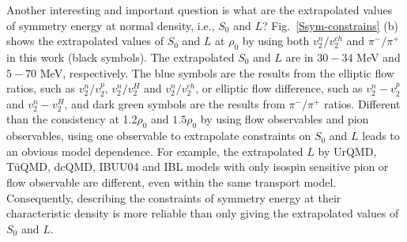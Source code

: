 \documentclass[reprint,aps,prc,twocolumn,superscriptaddress]{revtex4-1}
\begin{document}
Another interesting and important question is what are the extrapolated values of symmetry energy at normal density, i.e., $S_0$ and $L$? Fig.~\ref{Ssym-constrains} (b) shows the extrapolated values of $S_0$ and $L$ at $\rho_0$ by using both $v_2^n/v_2^{ch}$ and $\pi^-/\pi^+$ in this work (black symbols). The extrapolated $S_0$ and $L$ are in $30-34$ MeV and $5-70$ MeV, respectively. The blue symbols are the results from the elliptic flow ratios, such as $v_2^n/v_2^p$, $v_2^n/v_2^H$ and $v_2^n/v_2^{ch}$\cite{Russotto2011PLB,Cozma2013PRC,WangYJ2014PRC,Russotto2016PRC,Cozma2018EPJ}, or elliptic flow difference, such as $v_2^n-v_2^p$ and $v_2^n-v_2^H$\cite{Cozma2013PRC,WangYJ2014PRC}, and dark green symbols are the results from $\pi^-/\pi^+$ ratios\cite{ZGXiao2009PRL,ZQFeng2010PLB,WJXie2013PLB,Cozma2016PLB,YYLiu2021PRC,GCYong2021PRC,SpiRIT2021PRL}. Different than the consistency at 1.2$\rho_0$ and $1.5\rho_0$ by using flow observables and pion observables, using one observable to extrapolate constraints on $S_0$ and $L$ leads to an obvious model dependence. For example, the extrapolated $L$ by UrQMD, T\"uQMD, dcQMD, IBUU04 and IBL models with only isospin sensitive pion or flow observable are different, even within the same transport model. Consequently, describing the constraints of symmetry energy at their characteristic density is  more reliable than only giving the extrapolated values of $S_0$ and $L$.

\end{document}
